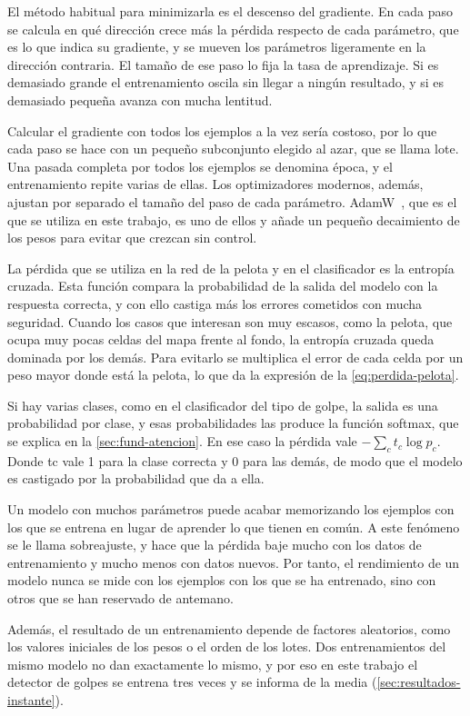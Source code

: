 El método habitual para minimizarla es el descenso del gradiente.
En cada paso se calcula en qué dirección crece más la pérdida respecto de cada parámetro, que es lo que indica su gradiente, y se mueven los parámetros ligeramente en la dirección contraria.
El tamaño de ese paso lo fija la tasa de aprendizaje.
Si es demasiado grande el entrenamiento oscila sin llegar a ningún resultado, y si es demasiado pequeña avanza con mucha lentitud.

Calcular el gradiente con todos los ejemplos a la vez sería costoso, por lo que cada paso se hace con un pequeño subconjunto elegido al azar, que se llama lote.
Una pasada completa por todos los ejemplos se denomina época, y el entrenamiento repite varias de ellas.
Los optimizadores modernos, además, ajustan por separado el tamaño del paso de cada parámetro.
AdamW~\cite{loshchilov2019adamw}, que es el que se utiliza en este trabajo, es uno de ellos y añade un pequeño decaimiento de los pesos para evitar que crezcan sin control.

La pérdida que se utiliza en la red de la pelota y en el clasificador es la entropía cruzada.
Esta función compara la probabilidad de la salida del modelo con la respuesta correcta, y con ello castiga más los errores cometidos con mucha seguridad.
Cuando los casos que interesan son muy escasos, como la pelota, que ocupa muy pocas celdas del mapa frente al fondo, la entropía cruzada queda dominada por los demás.
Para evitarlo se multiplica el error de cada celda por un peso mayor donde está la pelota, lo que da la expresión de la \cref{eq:perdida-pelota}.

Si hay varias clases, como en el clasificador del tipo de golpe, la salida es una probabilidad por clase, y esas probabilidades las produce la función softmax, que se explica en la \cref{sec:fund-atencion}.
En ese caso la pérdida vale $-\sum_c t_c \log p_c$.
Donde tc vale 1 para la clase correcta y 0 para las demás, de modo que el modelo es castigado por la probabilidad que da a ella.

Un modelo con muchos parámetros puede acabar memorizando los ejemplos con los que se entrena en lugar de aprender lo que tienen en común.
A este fenómeno se le llama sobreajuste, y hace que la pérdida baje mucho con los datos de entrenamiento y mucho menos con datos nuevos.
Por tanto, el rendimiento de un modelo nunca se mide con los ejemplos con los que se ha entrenado, sino con otros que se han reservado de antemano.

Además, el resultado de un entrenamiento depende de factores aleatorios, como los valores iniciales de los pesos o el orden de los lotes.
Dos entrenamientos del mismo modelo no dan exactamente lo mismo, y por eso en este trabajo el detector de golpes se entrena tres veces y se informa de la media (\cref{sec:resultados-instante}).

